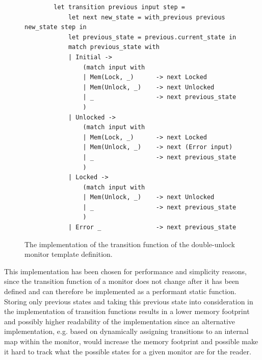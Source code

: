 \begin{figure}[H]
    \centering
    \begin{verbatim}
        let transition previous input step = 
            let next new_state = with_previous previous new_state step in
            let previous_state = previous.current_state in 
            match previous_state with 
            | Initial -> 
                (match input with 
                | Mem(Lock, _)      -> next Locked
                | Mem(Unlock, _)    -> next Unlocked
                | _                 -> next previous_state
                )
            | Unlocked ->
                (match input with 
                | Mem(Lock, _)      -> next Locked
                | Mem(Unlock, _)    -> next (Error input)
                | _                 -> next previous_state
                )
            | Locked ->
                (match input with 
                | Mem(Unlock, _)    -> next Unlocked
                | _                 -> next previous_state
                )
            | Error _               -> next previous_state
    \end{verbatim}
    \caption{The implementation of the transition function of the double-unlock monitor template definition.}
    \label{transition-implementation}
\end{figure}

\newpar This implementation has been chosen for performance and simplicity reasons, since the transition function of a monitor does not change after it has been defined and can therefore be implemented as a performant static function. Storing only previous states and taking this previous state into consideration in the implementation of transition functions results in a lower memory footprint and possibly higher readability of the implementation since an alternative implementation, e.g. based on dynamically assigning transitions to an internal map within the monitor, would increase the memory footprint and possible make it hard to track what the possible states for a given monitor are for the reader.
